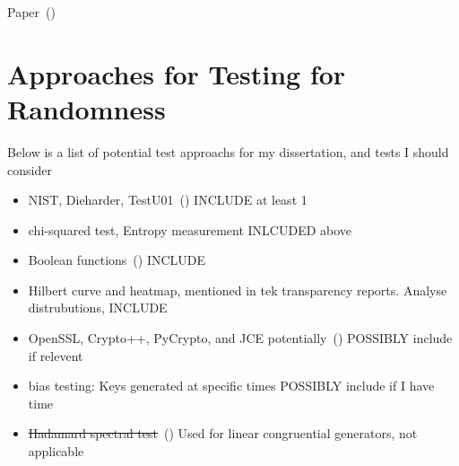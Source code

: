 Paper~(\cite{inproceedings})
\section{Approaches for Testing for Randomness}
\label{sec:TestApproachs}

Below is a list of potential test approachs for my dissertation, and tests I should consider
\begin{itemize}
    \item NIST, Dieharder, TestU01~(\cite{10.1145/3447773}) INCLUDE at least 1
    \item chi-squared test, Entropy measurement INLCUDED above
    \item Boolean functions~(\cite{10.1145/3205455.3205518}) INCLUDE
    \item Hilbert curve and heatmap, mentioned in tek transparency reports. Analyse distrubutions, INCLUDE
    \item OpenSSL, Crypto++, PyCrypto, and JCE potentially~(\cite{linkedInArticle}) POSSIBLY include if relevent
    \item bias testing: Keys generated at specific times POSSIBLY include if I have time
    \item \sout{Hadamard spectral test}~(\cite{WIKI}) Used for linear congruential generators, not applicable
\end{itemize}